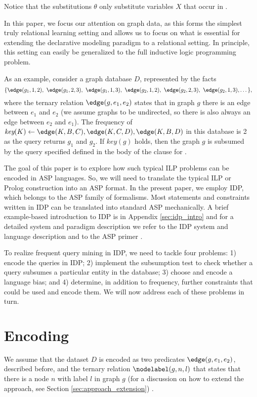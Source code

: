 Notice that the substitutions $\theta$ only substitute variables $X$ that occur in \keypred. 

In this paper, we focus our attention on graph data, as this forms the simplest truly relational learning setting and allows us to focus on what is essential for extending the declarative modeling paradigm to a relational setting. In principle, this setting can easily be generalized to the full inductive logic programming problem. 
 
As an example, consider a graph database $D$, represented by the facts 
\begin{equation*}
\{ \edge(g_1,1,2),~ \edge(g_1,2,3),~ \edge(g_1,1,3),~ \edge(g_2,1,2),~ \edge(g_2,2,3),~ \edge(g_2,1,3), \dots \},
\end{equation*}
where the ternary relation $\edge(g,e_1,e_2)$ states that in graph $g$ there is an edge between $e_1$ and $e_2$ (we assume graphs to be undirected, so there is also always an edge between $e_2$ and $e_1$). The frequency of $\textit{key}(K) \leftarrow \edge(K,B,C), \edge(K,C,D), \edge(K,B,D)$ in this database is 2 as the query returns $g_1$ and $g_2$. If $key(g)$ holds,  then the graph $g$ is subsumed by the query specified defined in the body of the clause for \keypred.

The goal of this paper is to explore how such typical ILP problems can be encoded in 
ASP languages.   So, we will need to translate the typical ILP or Prolog construction into an ASP format. 
In the present paper, we employ IDP, which belongs to the ASP family of formalisms. Most statements and constraints written in IDP can be translated into standard ASP mechanically. %
A brief example-based introduction to IDP is in Appendix \ref{sec:idp_intro} and for a detailed system and paradigm description we refer to the IDP system and language description \parencite{idp} and to the ASP primer \parencite{eiter}.

To realize frequent query mining in IDP, we need to tackle four problems: 1) encode the queries in IDP; 2) implement the subsumption test to check whether a query subsumes a particular entity in the database; 3) choose and encode a language bias; and 4) determine, in addition to frequency, further constraints that could be used and encode them. We will now address each of these problems in turn.

\section{Encoding}\label{sec:encoding}
We assume that the dataset $D$ is encoded as two predicates $\edge(g,e_1,e_2)$, described before, and the ternary relation $\nodelabel(g,n,l)$ that states that there is a node $n$ with label $l$ in graph $g$ (for a discussion on how to extend the approach, see Section \ref{sec:approach_extension}) . 

